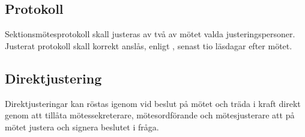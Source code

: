 \subsection{Protokoll}
Sektionsmötesprotokoll skall justeras av två av mötet valda justeringspersoner. Justerat protokoll skall korrekt anslås, enligt , senast tio läsdagar efter mötet.

\subsection{Direktjustering}
Direktjusteringar kan röstas igenom vid beslut på mötet och träda i kraft direkt genom att tillåta mötessekreterare, mötesordförande och mötesjusterare att på mötet justera och signera beslutet i fråga.